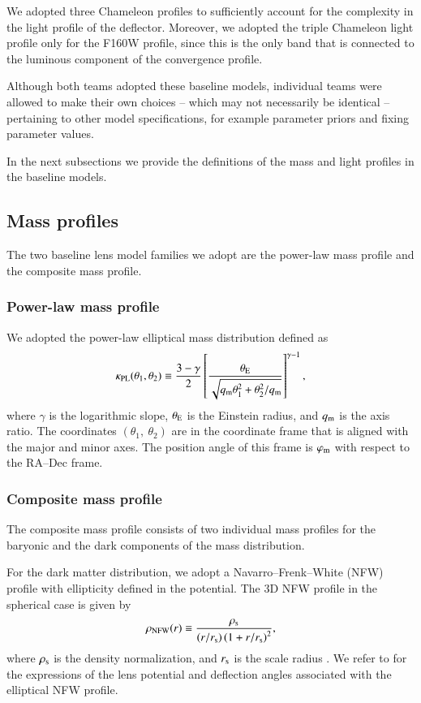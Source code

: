 \documentclass[longauth]{aa}
\newcommand{\ajs}[1]{{{#1}}}
\begin{document}
\ajs{We adopted three Chameleon profiles to sufficiently account for the complexity in the light profile of the deflector. Moreover, we adopted the triple Chameleon light profile only for the F160W profile, since this is the only band that is connected to the luminous component of the convergence profile.}

\ajs{Although both teams adopted these baseline models, individual teams were allowed to make their own choices -- which may not necessarily be identical -- pertaining to other model specifications, for example parameter priors and fixing parameter values.}

In the next subsections we provide the definitions of the mass and light profiles in the baseline models.

\subsection{Mass profiles}

The two baseline lens model families we adopt are the power-law mass profile and the composite mass profile.

\subsubsection{Power-law mass profile}
We adopted the power-law elliptical mass distribution \citep[PEMD;][]{Barkana98} defined as
%
\begin{equation}
        \kappa_{\rm PL}(\theta_1, \theta_2) \equiv \frac{3 - \gamma}{2} \left[ \frac{\theta_{\rm E}}{\sqrt{q_{\rm m} \theta_1^2 + \theta_2^2/q_{\rm m}}} \right]^{\gamma - 1},
\end{equation}
%
where $\gamma$ is the logarithmic slope, $\theta_{\rm E}$ is the Einstein radius, and $q_{\rm m}$ is the axis ratio. The coordinates $(\theta_1,\ \theta_2)$ are in the coordinate frame that is aligned with the major and minor axes. The position angle of this frame is $\varphi_{\rm m}$ with respect to the RA--Dec frame.

\subsubsection{Composite mass profile}
The composite mass profile consists of two individual mass profiles for the baryonic and the dark components of the mass distribution. 

For the dark matter distribution, we adopt a Navarro--Frenk--White (NFW) profile with ellipticity defined in the potential. The 3D NFW profile in the spherical case is given by
%
\begin{equation}
        \rho_{\rm NFW}(r) \equiv \frac{\rho_{\rm s}}{\left(r/r_{\rm s}\right) \left(1 + r/r_{\rm s}\right)^2},
\end{equation}
%
where $\rho_{\rm s}$ is the density normalization, and $r_{\rm s}$ is the scale radius \citep{Navarro97}. We refer to \citet{Golse02} for the expressions of the lens potential and deflection angles associated with the elliptical NFW profile.
\end{document}
